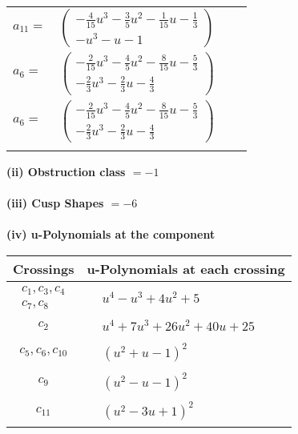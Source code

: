 \documentclass[1p]{elsarticle_modified}
\theoremstyle{definition}
\begin{document}
\begin{tabular}{m{7pt} m{180pt} m{7pt} m{180pt} }
\flushright $a_{11}=$&$\begin{pmatrix}-\frac{4}{15} u^3-\frac{3}{5} u^2-\frac{1}{15} u-\frac{1}{3}\\- u^3- u-1\end{pmatrix}$ \\
\flushright $a_{6}=$&$\begin{pmatrix}-\frac{2}{15} u^3-\frac{4}{5} u^2-\frac{8}{15} u-\frac{5}{3}\\-\frac{2}{3} u^3-\frac{2}{3} u-\frac{4}{3}\end{pmatrix}$\\ \flushright $a_{6}=$&$\begin{pmatrix}-\frac{2}{15} u^3-\frac{4}{5} u^2-\frac{8}{15} u-\frac{5}{3}\\-\frac{2}{3} u^3-\frac{2}{3} u-\frac{4}{3}\end{pmatrix}$\\&\end{tabular}
\flushleft \textbf{(ii) Obstruction class $= -1$}\\~\\
\flushleft \textbf{(iii) Cusp Shapes $= -6$}\\~\\
\newpage\renewcommand{\arraystretch}{1}
\flushleft \textbf{(iv) u-Polynomials at the component}\newline \\
\begin{tabular}{m{50pt}|m{274pt}}
Crossings & \hspace{64pt}u-Polynomials at each crossing \\
\hline $$\begin{aligned}c_{1},c_{3},c_{4}\\c_{7},c_{8}\end{aligned}$$&$\begin{aligned}
&u^4- u^3+4 u^2+5
\end{aligned}$\\
\hline $$\begin{aligned}c_{2}\end{aligned}$$&$\begin{aligned}
&u^4+7 u^3+26 u^2+40 u+25
\end{aligned}$\\
\hline $$\begin{aligned}c_{5},c_{6},c_{10}\end{aligned}$$&$\begin{aligned}
&(u^2+u-1)^2
\end{aligned}$\\
\hline $$\begin{aligned}c_{9}\end{aligned}$$&$\begin{aligned}
&(u^2- u-1)^2
\end{aligned}$\\
\hline $$\begin{aligned}c_{11}\end{aligned}$$&$\begin{aligned}
&(u^2-3 u+1)^2
\end{aligned}$\\
\hline
\end{tabular}\\~\\
\end{document}
